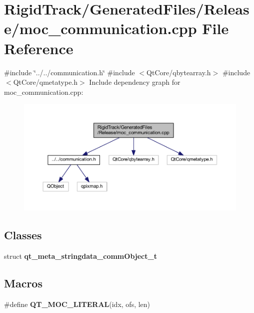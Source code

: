 \section{Rigid\+Track/\+Generated\+Files/\+Release/moc\+\_\+communication.cpp File Reference}
\label{_release_2moc__communication_8cpp}
{\ttfamily \#include \char`\"{}../../communication.\+h\char`\"{}}\newline
{\ttfamily \#include $<$Qt\+Core/qbytearray.\+h$>$}\newline
{\ttfamily \#include $<$Qt\+Core/qmetatype.\+h$>$}\newline
Include dependency graph for moc\+\_\+communication.\+cpp\+:\nopagebreak
\begin{figure}[H]
\begin{center}
\leavevmode
\includegraphics[width=350pt]{_release_2moc__communication_8cpp__incl}
\end{center}
\end{figure}
\subsection*{Classes}
\begin{DoxyCompactItemize}
\item 
struct \textbf{ qt\+\_\+meta\+\_\+stringdata\+\_\+comm\+Object\+\_\+t}
\end{DoxyCompactItemize}
\subsection*{Macros}
\begin{DoxyCompactItemize}
\item 
\#define \textbf{ Q\+T\+\_\+\+M\+O\+C\+\_\+\+L\+I\+T\+E\+R\+AL}(idx,  ofs,  len)
\end{DoxyCompactItemize}


